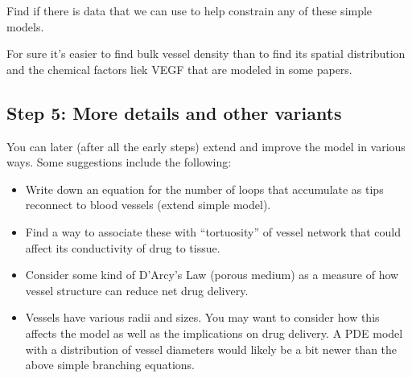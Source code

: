 Find if there is data that we can use to help constrain any of these simple models.

For sure it's easier to find bulk vessel density than to find its spatial distribution and the chemical factors liek VEGF that are modeled in some papers.


\subsection{Step 5: More details and other variants}

You can later (after all the early steps) extend and improve the model in various ways. Some suggestions include the following:

\begin{itemize}
	\item Write down an equation for the number of loops that accumulate as tips reconnect to blood vessels (extend simple model).
	\item Find a way to associate these with ``tortuosity'' of vessel network that could affect its conductivity of drug to tissue.
	\item Consider some kind of D'Arcy's Law (porous medium) as a measure of how vessel structure can reduce net drug delivery.
	\item Vessels have various radii and sizes. You may want to consider how this affects the model as well as the implications on drug delivery. A PDE model with a distribution of vessel diameters would likely be a bit newer than the above simple branching equations.
\end{itemize}

